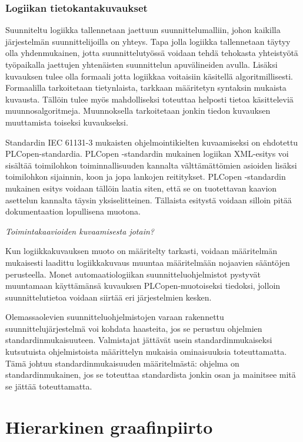 \documentclass[finnish,12pt]{article}
\begin{document}
		\subsubsection{Logiikan tietokantakuvaukset}

Suunniteltu logiikka tallennetaan jaettuun suunnittelumalliin, johon kaikilla järjestelmän suunnittelijoilla on yhteys.
Tapa jolla logiikka tallennetaan täytyy olla yhdenmukainen, jotta suunnittelutyössä voidaan tehdä tehokasta yhteistyötä työpaikalla jaettujen yhtenäisten suunnittelun apuvälineiden avulla.
Lisäksi kuvauksen tulee olla formaali jotta logiikkaa voitaisiin käsitellä algoritmillisesti.
Formaalilla tarkoitetaan tietynlaista, tarkkaan määritetyn syntaksin mukaista kuvausta.
Tällöin tulee myös mahdolliseksi toteuttaa helposti tietoa käsitteleviä muunnosalgoritmeja.
Muunnoksella tarkoitetaan jonkin tiedon kuvauksen muuttamista toiseksi kuvaukseksi.

Standardin IEC 61131-3 mukaisten ohjelmointikielten kuvaamiseksi on ehdotettu PLCopen-standardia.
PLCopen -standardin mukainen logiikan XML-esitys voi sisältää toimilohkon toiminnallisuuden kannalta välttämättömien asioiden lisäksi toimilohkon sijainnin, koon ja jopa lankojen reititykset.
PLCopen -standardin mukainen esitys voidaan tällöin laatia siten, että se on tuotettavan kaavion asettelun kannalta täysin yksiselitteinen.
Tällaista esitystä voidaan silloin pitää dokumentaation lopullisena muotona.

\emph{Toimintakaavioiden kuvaamisesta jotain?}

Kun logiikkakuvauksen muoto on määritelty tarkasti, voidaan määritelmän mukaisesti laadittu logiikkakuvaus muuntaa määritelmään nojaavien sääntöjen perusteella.
Monet automaatiologiikan suunnitteluohjelmistot pystyvät muuntamaan käyttämänsä kuvauksen PLCopen-muotoiseksi tiedoksi, jolloin suunnittelutietoa voidaan siirtää eri järjestelmien kesken.

Olemassaolevien suunnitteluohjelmistojen varaan rakennettu suunnittelujärjestelmä voi kohdata haasteita, jos se perustuu ohjelmien standardinmukaisuuteen.
Valmistajat jättävät usein standardinmukaiseksi kutsutuista ohjelmistoista määrittelyn mukaisia ominaisuuksia toteuttamatta.\cite{RefWorks:42}
Tämä johtuu standardinmukaisuuden määritelmästä: ohjelma on standardinmukainen, jos se toteuttaa standardista jonkin osan ja mainitsee mitä se jättää toteuttamatta. 

	\clearpage
	\section{Hierarkinen graafinpiirto}
	
\end{document}
